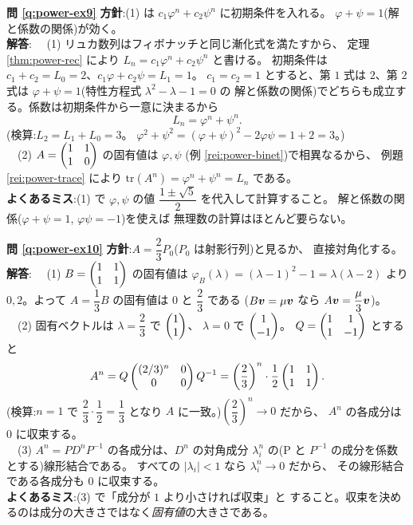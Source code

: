 \bigskip
\noindent\textbf{問 \ref{q:power-ex9}}\quad
\textbf{方針}:(1) は $c_1\varphi^n + c_2\psi^n$ に初期条件を入れる。
$\varphi + \psi = 1$(解と係数の関係)が効く。\\
\textbf{解答}:
　(1) リュカ数列はフィボナッチと同じ漸化式を満たすから、
定理 \ref{thm:power-rec} により $L_n = c_1\varphi^n + c_2\psi^n$ と書ける。
初期条件は $c_1 + c_2 = L_0 = 2$、$c_1\varphi + c_2\psi = L_1 = 1$。
$c_1 = c_2 = 1$ とすると、第 $1$ 式は $2$、第 $2$ 式は
$\varphi + \psi = 1$(特性方程式 $\lambda^2 - \lambda - 1 = 0$ の
解と係数の関係)でどちらも成立する。係数は初期条件から一意に決まるから
\[
L_n = \varphi^n + \psi^n.
\]
(検算:$L_2 = L_1 + L_0 = 3$。
$\varphi^2 + \psi^2 = (\varphi + \psi)^2 - 2\varphi\psi = 1 + 2 = 3$。)\\
　(2) $A = \begin{pmatrix}1 & 1 \\ 1 & 0\end{pmatrix}$ の固有値は $\varphi, \psi$
(例 \ref{rei:power-binet})で相異なるから、
例題 \ref{rei:power-trace} により
$\mathrm{tr}(A^n) = \varphi^n + \psi^n = L_n$ である。\\
\textbf{よくあるミス}:(1) で $\varphi, \psi$ の値
$\dfrac{1 \pm \sqrt{5}}{2}$ を代入して計算すること。
解と係数の関係($\varphi + \psi = 1$, $\varphi\psi = -1$)を使えば
無理数の計算はほとんど要らない。

\bigskip
\noindent\textbf{問 \ref{q:power-ex10}}\quad
\textbf{方針}:$A = \dfrac{2}{3}P_0$($P_0$ は射影行列)と見るか、
直接対角化する。\\
\textbf{解答}:
　(1) $B = \begin{pmatrix}1 & 1 \\ 1 & 1\end{pmatrix}$ の固有値は
$\varphi_B(\lambda) = (\lambda - 1)^2 - 1 = \lambda(\lambda - 2)$ より
$0, 2$。よって $A = \dfrac{1}{3}B$ の固有値は
$0$ と $\dfrac{2}{3}$ である
($B\bm{v} = \mu\bm{v}$ なら $A\bm{v} = \dfrac{\mu}{3}\bm{v}$)。\\
　(2) 固有ベクトルは $\lambda = \dfrac{2}{3}$ で $\begin{pmatrix}1 \\ 1\end{pmatrix}$、
$\lambda = 0$ で $\begin{pmatrix}1 \\ -1\end{pmatrix}$。
$Q = \begin{pmatrix}1 & 1 \\ 1 & -1\end{pmatrix}$ とすると
\[
A^n = Q\begin{pmatrix}(2/3)^n & 0 \\ 0 & 0\end{pmatrix}Q^{-1}
= \left(\frac{2}{3}\right)^n \cdot \frac{1}{2}\begin{pmatrix}1 & 1 \\ 1 & 1\end{pmatrix}.
\]
(検算:$n = 1$ で $\dfrac{2}{3} \cdot \dfrac{1}{2} = \dfrac{1}{3}$ となり
$A$ に一致。)$\left(\dfrac{2}{3}\right)^n \to 0$ だから、
$A^n$ の各成分は $0$ に収束する。\\
　(3) $A^n = PD^nP^{-1}$ の各成分は、$D^n$ の対角成分
$\lambda_i^n$ の(P と $P^{-1}$ の成分を係数とする)線形結合である。
すべての $|\lambda_i| < 1$ なら $\lambda_i^n \to 0$ だから、
その線形結合である各成分も $0$ に収束する。\\
\textbf{よくあるミス}:(3) で「成分が $1$ より小さければ収束」と
すること。収束を決めるのは成分の大きさではなく\emph{固有値}の大きさである。

